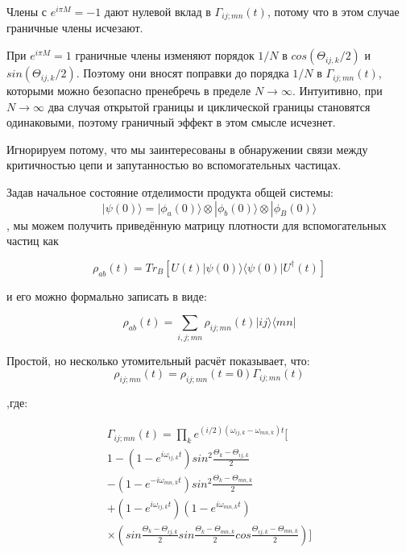 \documentclass[11pt]{article}
\begin{document}
 Члены с $e^{i\pi M} = −1$ дают нулевой вклад в $\Gamma_{ij;mn}(t)$, потому что в этом случае граничные члены исчезают. 
 
 При $e^{i\pi M} = 1$ граничные члены изменяют порядок $1/N$ в $cos(\Theta_{ij,k}/2)$ и $sin(\Theta_{ij,k}/2)$. Поэтому они вносят поправки до порядка $1/N$ в $\Gamma_{ij;mn}(t)$, которыми можно безопасно пренебречь в пределе $N \rightarrow \infty$. Интуитивно, при $N \rightarrow \infty$ два случая открытой границы и циклической границы становятся одинаковыми, поэтому граничный эффект в этом смысле исчезнет.

Игнорируем потому, что мы заинтересованы в обнаружении связи между критичностью цепи и запутанностью во вспомогательных частицах.

Задав начальное состояние отделимости продукта общей системы:
\begin{equation*}
|\psi(0)\rangle = |\phi_a(0)\rangle \otimes |\phi_b(0)\rangle \otimes |\phi_B(0)\rangle
\end{equation*} 
 , мы можем получить приведённую матрицу плотности для вспомогательных частиц как

\begin{equation*}
\rho_{ab}(t)=Tr_B[U(t)|\psi(0)\rangle \langle \psi(0)|U^†(t)]
\end{equation*}
 
и его можно формально записать в виде:

\begin{equation*}
\rho_{ab}(t)=\sum\limits_{i,j;mn}\rho_{ij;mn}(t)|ij\rangle \langle mn|
\end{equation*}

Простой, но несколько утомительный расчёт показывает, что:
\begin{equation*}
\rho_{ij;mn}(t)=\rho_{ij;mn}(t=0)\Gamma_{ij;mn}(t)
\end{equation*}

,где:

\begin{equation}
\begin{gathered}
\Gamma_{ij;mn}(t)=\prod_k e^{(i/2)(\omega_{ij,k}-\omega_{mn,k})t}[\\
1-(1-e^{i\omega_{ij,k}t})sin^2\frac{\Theta_k-\Theta_{ij,k}}{2} \\
- (1-e^{-i\omega_{mn,k}t})sin^2\frac{\Theta_k-\Theta_{mn,k}}{2} \\
+ (1-e^{i\omega_{ij,k}t})(1-e^{i\omega_{mn,k}t}) \\
\times (sin\frac{\Theta_k-\Theta_{ij,k}}{2}sin\frac{\Theta_k-\Theta_{mn,k}}{2}
cos\frac{\Theta_{ij,k}-\Theta_{mn,k}}{2}
)
]
\end{gathered}
\label{eq_5}
\end{equation}
\end{document}
